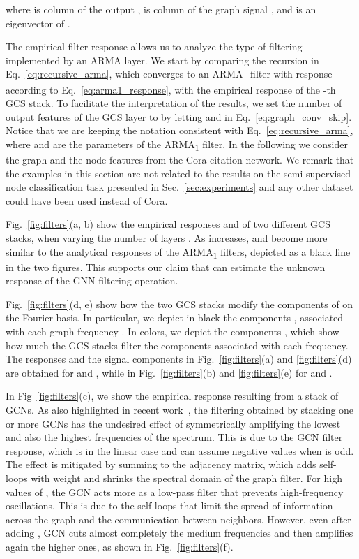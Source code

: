 \documentclass{article}
\begin{document}
where  is column  of the output ,  is column  of the graph signal , and  is an eigenvector of .

The empirical filter response allows us to analyze the type of filtering implemented by an ARMA layer.
We start by comparing the recursion in Eq.~\eqref{eq:recursive_arma}, which converges to an ARMA\textsubscript{1} filter with response  according to Eq.~\eqref{eq:arma1_response}, with the empirical response  of the -th GCS stack.
To facilitate the interpretation of the results, we set the number of output features of the GCS layer to  by letting  and  in Eq.~\eqref{eq:graph_conv_skip}.
Notice that we are keeping the notation consistent with Eq.~\eqref{eq:recursive_arma}, where  and  are the parameters of the ARMA\textsubscript{1} filter.
In the following we consider the graph and the node features from the Cora citation network.
We remark that the examples in this section are not related to the results on the semi-supervised node classification task presented in Sec.~\ref{sec:experiments} and any other dataset could have been used instead of Cora.

Fig.~\ref{fig:filters}(a, b) show the empirical responses  and  of two different GCS stacks, when varying the number of layers .
As  increases,  and  become more similar to the analytical responses of the ARMA\textsubscript{1} filters, depicted as a black line in the two figures.
This supports our claim that  can estimate the unknown response of the GNN filtering operation.

Fig.~\ref{fig:filters}(d, e) show how the two GCS stacks modify the components of  on the Fourier basis.
In particular, we depict in black the components ,  associated with each graph frequency .
In colors, we depict the components , which show how much the GCS stacks filter the components associated with each frequency.
The responses and the signal components in Fig.~\ref{fig:filters}(a) and \ref{fig:filters}(d) are obtained for  and , while in Fig.~\ref{fig:filters}(b) and \ref{fig:filters}(e) for  and .

In Fig~\ref{fig:filters}(c), we show the empirical response resulting from a stack of GCNs.
As also highlighted in recent work~\cite{wu2019simplifying, maehara2019revisiting}, the filtering obtained by stacking one or more GCNs has the undesired effect of symmetrically amplifying the lowest and also the highest frequencies of the spectrum. 
This is due to the GCN filter response, which is  in the linear case and can assume negative values when  is odd.
The effect is mitigated by summing  to the adjacency matrix, which adds self-loops with weight  and shrinks the spectral domain of the graph filter.
For high values of , the GCN acts more as a low-pass filter that prevents high-frequency oscillations.
This is due to the self-loops that limit the spread of information across the graph and the communication between neighbors.
However, even after adding , GCN cuts almost completely the medium frequencies and then amplifies again the higher ones, as shown in Fig.~\ref{fig:filters}(f).
\end{document}
